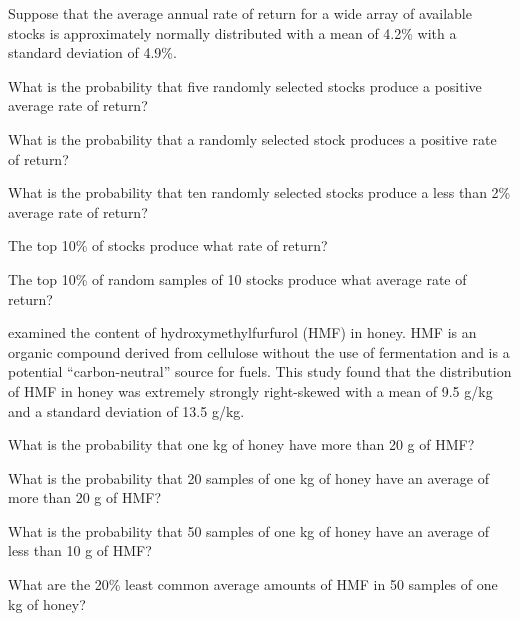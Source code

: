 \documentclass[10pt,openany]{book}\usepackage[]{graphicx}\usepackage[]{color}
\begin{document}
\begin{exsection}
  \item \label{revex:CLTStocks} \rhw{} Suppose that the average annual rate of return for a wide array of available stocks is approximately normally distributed with a mean of 4.2\% with a standard deviation of 4.9\%.
    \begin{Enumerate}
      \item What is the probability that five randomly selected stocks produce a positive average rate of return?
      \item What is the probability that a randomly selected stock produces a positive rate of return?
      \item What is the probability that ten randomly selected stocks produce a less than 2\% average rate of return?
      \item The top 10\% of stocks produce what rate of return?
      \item The top 10\% of random samples of 10 stocks produce what average rate of return?
    \end{Enumerate}

  \item \label{revex:CLTHoney} \rhw{} \cite{Renner1970} examined the content of hydroxymethylfurfurol (HMF) in honey.  HMF is an organic compound derived from cellulose without the use of fermentation and is a potential ``carbon-neutral'' source for fuels.  This study found that the distribution of HMF in honey was extremely strongly right-skewed with a mean of 9.5 g/kg and a standard deviation of 13.5 g/kg.
    \begin{Enumerate}
      \item What is the probability that one kg of honey have more than 20 g of HMF?
      \item What is the probability that 20 samples of one kg of honey have an average of more than 20 g of HMF?
      \item What is the probability that 50 samples of one kg of honey have an average of less than 10 g of HMF?
      \item What are the 20\% least common average amounts of HMF in 50 samples of one kg of honey?
    \end{Enumerate}


\end{exsection}
\end{document}
